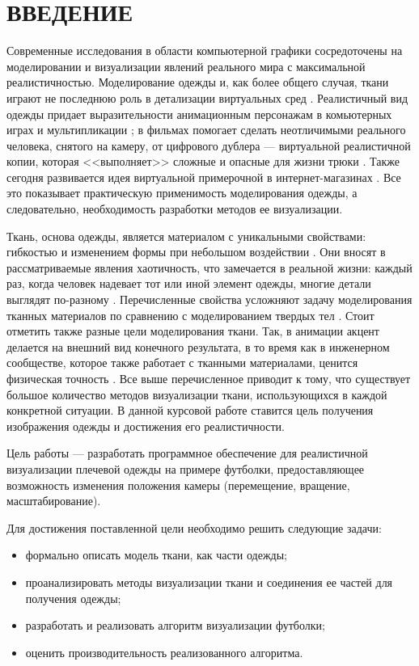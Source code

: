 \chapter*{ВВЕДЕНИЕ}

Современные исследования в области компьютерной графики сосредоточены на
моделировании и визуализации явлений реального мира с максимальной
реалистичностью. Моделирование одежды и, как более общего случая, ткани играют
не последнюю роль в детализации виртуальных сред \cite{bib01}.  Реалистичный вид
одежды придает выразительности анимационным персонажам в комьютерных играх и
мультипликации \cite{bib02}; в фильмах помогает сделать неотличимыми реального
человека, снятого на камеру, от цифрового дублера --- виртуальной реалистичной
копии, которая <<выполняет>> сложные и  опасные для жизни трюки \cite{bib03}.
Также сегодня развивается идея виртуальной примерочной в интернет-магазинах
\cite{bib04}. Все это показывает практическую применимость моделирования одежды,
а следовательно, необходимость разработки методов ее визуализации.

Ткань, основа одежды, является материалом с уникальными свойствами: гибкостью и
изменением формы при небольшом воздействии \cite{bib05}. Они вносят в
рассматриваемые явления хаотичность, что  замечается в реальной жизни: каждый
раз, когда человек надевает тот или иной элемент одежды, многие детали выглядят
по-разному \cite{bib06}.  Перечисленные свойства усложняют задачу моделирования
тканных материалов по сравнению с моделированием твердых тел \cite{bib07}.
Стоит отметить также разные цели моделирования ткани. Так, в анимации акцент
делается на внешний вид конечного результата, в то время как в инженерном
сообществе, которое также работает с тканными материалами, ценится физическая
точность \cite{bib03}. Все выше перечисленное приводит к тому, что существует
большое количество методов визуализации ткани, использующихся в каждой
конкретной ситуации. В данной курсовой работе ставится цель получения
изображения одежды и достижения его реалистичности.

Цель работы --- разработать программное обеспечение для реалистичной
визуализации плечевой одежды на примере футболки, предоставляющее возможность
изменения положения камеры (перемещение, вращение, масштабирование).

Для достижения поставленной цели необходимо решить следующие задачи:
\begin{itemize}[left=\parindent]
    \item  формально описать модель ткани, как части одежды;
    \item  проанализировать методы визуализации ткани и соединения ее частей для
        получения одежды;
    \item  разработать и реализовать алгоритм визуализации футболки;
    \item оценить производительность реализованного алгоритма.
\end{itemize}

